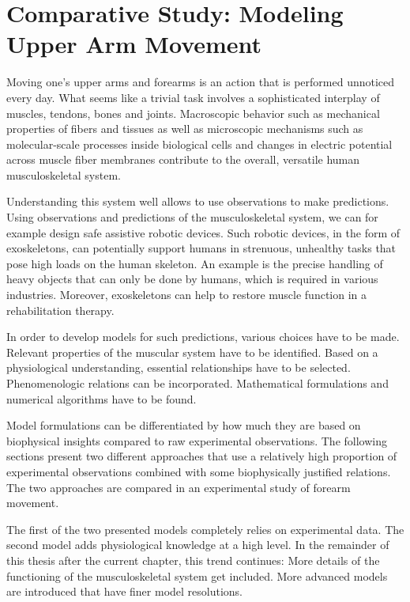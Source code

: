
\chapter{Comparative Study: Modeling Upper Arm Movement}\label{chap:comparative_study}

Moving one's upper arms and forearms is an action that is performed unnoticed every day. 
What seems like a trivial task involves a sophisticated interplay of muscles, tendons, bones and joints. Macroscopic behavior such as mechanical properties of fibers and tissues as well as microscopic mechanisms such as molecular-scale processes inside biological cells and changes in electric potential across muscle fiber membranes contribute to the overall, versatile human musculoskeletal system.

Understanding this system well allows to use observations to make predictions.
Using observations and predictions of the musculoskeletal system, we can for example design safe assistive robotic devices.
Such robotic devices, in the form of exoskeletons, can potentially support humans in strenuous, unhealthy tasks that pose high loads on the human skeleton. An example is the precise handling of heavy objects that can only be done by humans, which is required in various industries. Moreover, exoskeletons can help to restore muscle function in a rehabilitation therapy.

In order to develop models for such predictions, various choices have to be made. 
Relevant properties of the muscular system have to be identified. Based on a physiological understanding, essential relationships have to be selected. Phenomenologic relations can be incorporated. Mathematical formulations and numerical algorithms have to be found.

Model formulations can be differentiated by how much they are based on biophysical insights compared to raw experimental observations. The following sections present two different approaches that use a relatively high proportion of experimental observations combined with some biophysically justified relations. The two approaches are compared in an experimental study of forearm movement. 

The first of the two presented models completely relies on experimental data. The second model adds physiological knowledge at a high level. In the remainder of this thesis after the current chapter, this trend continues: More details of the functioning of the musculoskeletal system get included. More advanced models are introduced that have finer model resolutions.

